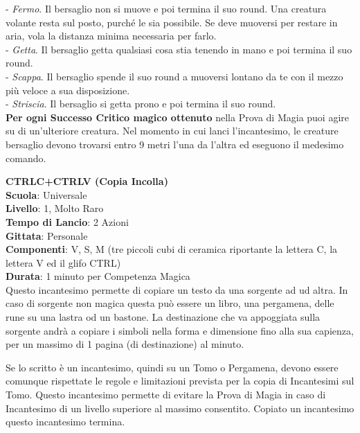 \begin{multicols}{2}
- \textit{Fermo}. Il bersaglio non si muove e poi termina il suo round. Una creatura volante resta sul posto, purché le sia possibile. Se deve muoversi per restare in aria, vola la distanza minima necessaria per farlo.\\

- \textit{Getta}. Il bersaglio getta qualsiasi cosa stia tenendo in mano e poi termina il suo round.\\

- \textit{Scappa}. Il bersaglio spende il suo round a muoversi lontano da te con il mezzo più veloce a sua disposizione.\\

- \textit{Striscia}. Il bersaglio si getta prono e poi termina il suo round.\\

\textbf{Per ogni Successo Critico magico ottenuto} nella Prova di Magia puoi agire su di un'ulteriore creatura. Nel momento in cui lanci l'incantesimo, le creature bersaglio devono trovarsi entro 9 metri l'una da l'altra ed eseguono il medesimo comando.

\medskip\textbf{CTRLC+CTRLV (Copia Incolla)}\\
\textbf{Scuola}: Universale\\
\textbf{Livello}: 1, Molto Raro\\
\textbf{Tempo di Lancio}: 2 Azioni\\
\textbf{Gittata}: Personale\\
\textbf{Componenti}: V, S, M (tre piccoli cubi di ceramica riportante la lettera C, la lettera V ed il glifo CTRL)\\
\textbf{Durata}: 1 minuto per Competenza Magica\\
Questo incantesimo permette di copiare un testo da una sorgente ad ud altra. In caso di sorgente non magica questa può essere un libro, una pergamena, delle rune su una lastra od un bastone. La destinazione che va appoggiata sulla sorgente andrà a copiare i simboli nella forma e dimensione fino alla sua capienza, per un massimo di 1 pagina (di destinazione) al minuto.

Se lo scritto è un incantesimo, quindi su un Tomo o Pergamena, devono essere comunque rispettate le regole e limitazioni prevista per la copia di Incantesimi sul Tomo. Questo incantesimo permette di evitare la Prova di Magia in caso di Incantesimo di un livello superiore al massimo consentito. Copiato un incantesimo questo incantesimo termina.


\end{multicols}

